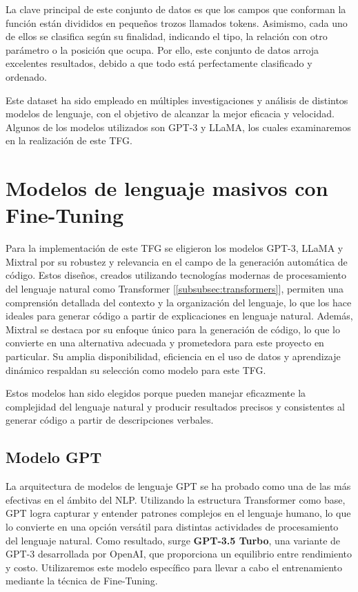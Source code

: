 La clave principal de este conjunto de datos es que los campos que conforman la función están divididos en pequeños trozos llamados \gls{token}s. Asimismo, cada uno de ellos se clasifica según su finalidad, indicando el tipo, la relación con otro parámetro o la posición que ocupa. Por ello, este conjunto de datos arroja excelentes resultados, debido a que todo está perfectamente clasificado y ordenado.

Este \gls{dataset} ha sido empleado en múltiples investigaciones y análisis de distintos modelos de lenguaje, con el objetivo de alcanzar la mejor eficacia y velocidad. Algunos de los modelos utilizados son \acrshort{GPT}-3 y \acrshort{LLaMA}, los cuales examinaremos en la realización de este \acrshort{TFG}.

\section{Modelos de lenguaje masivos con Fine-Tuning}

Para la implementación de este \acrshort{TFG} se eligieron los modelos \acrshort{GPT}-3, \acrshort{LLaMA} y Mixtral por su robustez y relevancia en el campo de la generación automática de código. Estos diseños, creados utilizando tecnologías modernas de procesamiento del lenguaje natural como Transformer [\ref{subsubsec:transformers}], permiten una comprensión detallada del contexto y la organización del lenguaje, lo que los hace ideales para generar código a partir de explicaciones en lenguaje natural. Además, Mixtral se destaca por su enfoque único para la generación de código, lo que lo convierte en una alternativa adecuada y prometedora para este proyecto en particular. Su amplia disponibilidad, eficiencia en el uso de datos y aprendizaje dinámico respaldan su selección como modelo para este \acrfull{TFG}.

Estos modelos han sido elegidos porque pueden manejar eficazmente la complejidad del lenguaje natural y producir resultados precisos y consistentes al generar código a partir de descripciones verbales.

\subsection{Modelo GPT}
\label{subsec:modelogpt}

La arquitectura de modelos de lenguaje \acrshort{GPT} se ha probado como una de las más efectivas en el ámbito del \acrfull{NLP}. Utilizando la estructura Transformer como base, \acrshort{GPT} logra capturar y entender patrones complejos en el lenguaje humano, lo que lo convierte en una opción versátil para distintas actividades de procesamiento del lenguaje natural. Como resultado, surge \textbf{GPT-3.5 Turbo}\cite{GPT-3.5}, una variante de \acrshort{GPT}-3 desarrollada por OpenAI, que proporciona un equilibrio entre rendimiento y costo. Utilizaremos este modelo específico para llevar a cabo el entrenamiento mediante la técnica de Fine-Tuning.

